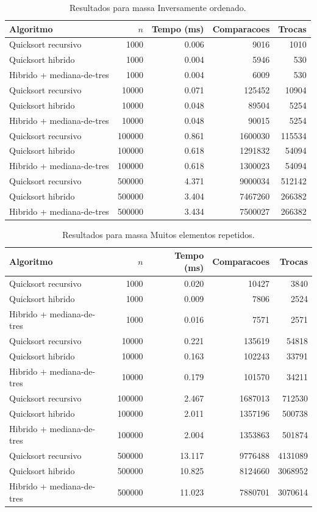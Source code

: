 \begin{table}[H]
\centering
\caption{Resultados para massa Inversamente ordenado.}
\label{tab:inverso}
\begin{tabular}{lrrrr}
\hline
Algoritmo & $n$ & Tempo (ms) & Comparacoes & Trocas \\
\hline
Quicksort recursivo & 1000 & 0.006 & 9016 & 1010 \\
Quicksort hibrido & 1000 & 0.004 & 5946 & 530 \\
Hibrido + mediana-de-tres & 1000 & 0.004 & 6009 & 530 \\
Quicksort recursivo & 10000 & 0.071 & 125452 & 10904 \\
Quicksort hibrido & 10000 & 0.048 & 89504 & 5254 \\
Hibrido + mediana-de-tres & 10000 & 0.048 & 90015 & 5254 \\
Quicksort recursivo & 100000 & 0.861 & 1600030 & 115534 \\
Quicksort hibrido & 100000 & 0.618 & 1291832 & 54094 \\
Hibrido + mediana-de-tres & 100000 & 0.618 & 1300023 & 54094 \\
Quicksort recursivo & 500000 & 4.371 & 9000034 & 512142 \\
Quicksort hibrido & 500000 & 3.404 & 7467260 & 266382 \\
Hibrido + mediana-de-tres & 500000 & 3.434 & 7500027 & 266382 \\
\hline
\end{tabular}
\end{table}

\begin{table}[H]
\centering
\caption{Resultados para massa Muitos elementos repetidos.}
\label{tab:repetidos}
\begin{tabular}{lrrrr}
\hline
Algoritmo & $n$ & Tempo (ms) & Comparacoes & Trocas \\
\hline
Quicksort recursivo & 1000 & 0.020 & 10427 & 3840 \\
Quicksort hibrido & 1000 & 0.009 & 7806 & 2524 \\
Hibrido + mediana-de-tres & 1000 & 0.016 & 7571 & 2571 \\
Quicksort recursivo & 10000 & 0.221 & 135619 & 54818 \\
Quicksort hibrido & 10000 & 0.163 & 102243 & 33791 \\
Hibrido + mediana-de-tres & 10000 & 0.179 & 101570 & 34211 \\
Quicksort recursivo & 100000 & 2.467 & 1687013 & 712530 \\
Quicksort hibrido & 100000 & 2.011 & 1357196 & 500738 \\
Hibrido + mediana-de-tres & 100000 & 2.004 & 1353863 & 501874 \\
Quicksort recursivo & 500000 & 13.117 & 9776488 & 4131089 \\
Quicksort hibrido & 500000 & 10.825 & 8124660 & 3068952 \\
Hibrido + mediana-de-tres & 500000 & 11.023 & 7880701 & 3070614 \\
\hline
\end{tabular}
\end{table}

